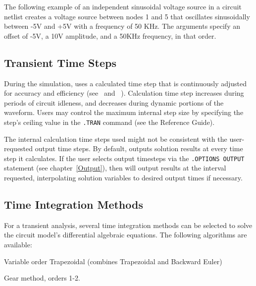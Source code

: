 The following example of an independent sinusoidal voltage source in a
circuit netlist creates a voltage source between nodes 1 and 5
that oscillates sinusoidally between -5V and +5V with a frequency of
50 KHz.  The arguments specify an offset of -5V, a 10V amplitude, and
a 50KHz frequency, in that order.



\subsection{Transient Time Steps}
\label{Time_Steps}
 

During the simulation, \Xyce{} uses a calculated time step that is
continuously adjusted for accuracy and efficiency
(see~\cite{WKHH:2000} and ~\cite{Petzold:1996}).  Calculation time
step increases during periods of circuit idleness, and decreases
during dynamic portions of the waveform.   Users may control the maximum internal step size by specifying
the step's ceiling value in the \verb|.TRAN| command (see the \Xyce{}
Reference Guide\ReferenceGuide{}).

The internal calculation time steps used might not be consistent with
the user-requested  output time steps.  By
default, \Xyce{} outputs solution results at every time step it
calculates.  If the user selects output timesteps via the
\verb|.OPTIONS OUTPUT| statement (see chapter~\ref{Output}), then
\Xyce{} will output results at the interval requested, interpolating
solution variables to desired output times if necessary.


\subsection{Time Integration Methods}
\label{TransientControls}
 

For a transient analysis, several time integration methods can be
selected to solve the circuit model's differential algebraic
equations.  The following algorithms are available:

\begin{XyceItemize}
\item Variable order Trapezoidal (combines Trapezoidal and Backward Euler) 
\item Gear method, orders 1-2.
\end{XyceItemize}




